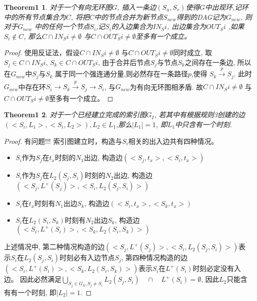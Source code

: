 \documentclass{article}
\newtheorem{theorem}{Theorem1}
\begin{document}
\begin{theorem}
    对于一个有向无环图$G$, 插入一条边$(S_u,S_v)$使得$G$中出现环,记环中的所有节点集合为$C$, 将把$C$中的节点合并为新节点$S_{new}$得到的DAG记为$G_{new}$, 则对于$G_{new}$
    中的任何一个节点$S_i$,记$S_i$的入边集合为$IN_Si$, 出边集合为$OUT_Si$ ,如果$S_i \notin C$, 那么$C \cap IN_Si \neq \emptyset$ 与$C \cap OUT_Si \neq \emptyset$至多有一个成立。 
\end{theorem}

\begin{proof} 
    使用反证法，假设$C \cap IN_Si \neq \emptyset$ 与$C \cap OUT_Si \neq \emptyset$同时成立, 取$S_j \in C \cap IN_Si$, $S_k \in C \cap OUT_Si$, 由于合并后节点$S_j$与节点$S_k$之间存在一条边, 所以在$G_{new}$中$S_j$与$S_k$
    属于同一个强连通分量,则必然存在一条路径$p$,使得 $ S_k \xrightarrow[]{p} S_j $. 此时$G_{new}$中存在环$S_i \xrightarrow[]{} S_k \xrightarrow[]{p} S_j \xrightarrow[]{} S_i$, 与$G_{new}$为有向无环图相矛盾.
    故$C \cap IN_Si \neq \emptyset$ 与$C \cap OUT_Si\neq \emptyset$至多有一个成立。
\end{proof}

\begin{theorem}
   对于一个已经建立完成的索引图$G_I$, 若其中有根据规则3创建的边$(<S_i, L_1>, <S_i, L_2>), L_2 \in L_1$,那么$|L_1| = 1$, 即$L_1$中只含有一个时刻.
\end{theorem}

\begin{proof} 
    有问题!!! \newline
    索引图建立时，构造与$S_i$相关的出入边共有四种情况。
    \begin{center}
    \begin{itemize}
        \item $S_i$作为$S_j$在$t_x$时刻的$N_1$出边, 构造边$(<S_j, t_x>,<S_i,t_x>)$
        \item $S_i$作为$S_j$在$L_2(S_j, S_i)$时刻的$N_2$出边, 构造边$(<S_j, L^+(S_j)>,<S_i, L_2(S_j, S_i)>)$
        \item $S_i$在$t_x$时刻有$N_1$出边$S_k$, 构造边$(<S_i, t_x>,<S_k,t_x>)$
        \item $S_i$在$L_2(S_i, S_k)$时刻有$N_2$出边$S_k$, 构造边$(<S_i, L^+(S_i)>,<S_k, L_2(S_i, S_k)>)$
    \end{itemize}
    \end{center}
    上述情况中, 
    第二种情况构造的边$(<S_j, L^+(S_j)>,<S_i, L_2(S_j, S_i)>)$表示$S_i$在$L_2(S_j, S_i)$时刻必有入边节点$S_j$,
    第四种情况构造的边$(<S_i, L^+(S_i)>,<S_k, L_2(S_i, S_k)>)$表示$S_i$在$L^+(S_i)$时刻必定没有入边。\newline
    因此必然满足$\bigcup \limits_{S_j \in G_S, S_j \neq S_i} L_2(S_j, S_i) \quad \cap \quad L^+(S_i) = \emptyset$, 因此$L_2$只能含有有一个时刻, 即$|L_2| = 1 $.
\end{proof}
\end{document}
